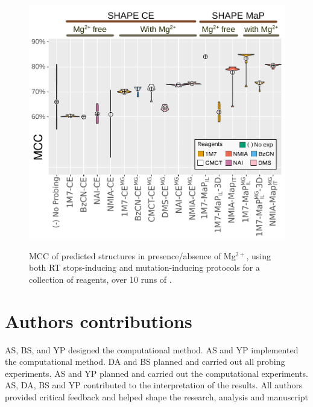 \documentclass[a4,center,fleqn]{NAR}
\begin{document}
\begin{figure}
	{\centering\includegraphics[width=1\linewidth]{graphs/boxplotreproducibility}\\}
	
	\caption{MCC of predicted structures in presence/absence of Mg$^{2+}$, using both RT stops-inducing and mutation-inducing protocols for a collection of reagents, over 10 runs of \OurTool{}. }\label{fig:reproducibility}
\end{figure}




%
%
%
%
%	
%	

\section*{Authors contributions}
AS, BS, and YP designed the computational method. 
AS and YP implemented the computational method.
DA and BS planned and carried out all probing experiments.
AS and YP planned and carried out the computational experiments. 
AS, DA, BS and YP contributed to the interpretation of the results. 
All authors provided critical feedback and helped shape the research, analysis and manuscript
\end{document}
